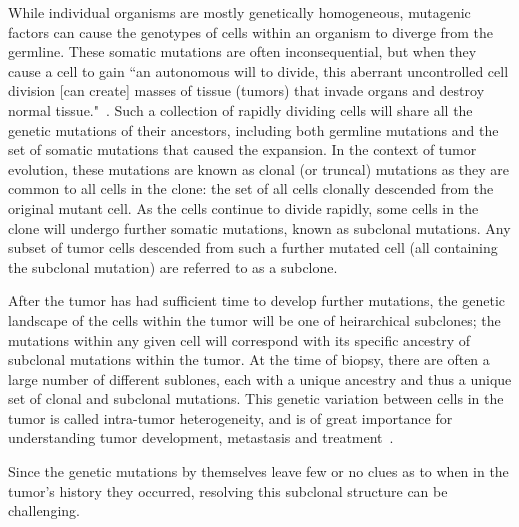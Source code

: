 \documentclass[../../main.tex]{subfiles}
\begin{document}
While individual organisms are mostly genetically homogeneous, mutagenic factors can cause the genotypes of cells within an organism to diverge from the germline.
These somatic mutations are often inconsequential, but when they cause a cell to gain ``an autonomous will to divide, this aberrant uncontrolled cell division [can create] masses of tissue (tumors) that invade organs and destroy normal tissue."~\cite{EmperorMaladies}. 
Such a collection of rapidly dividing cells will share all the genetic mutations of their ancestors, including both germline mutations and the set of somatic mutations that caused the expansion.
In the context of tumor evolution, these mutations are known as clonal (or truncal) mutations as they are common to all cells in the clone: the set of all cells clonally descended from the original mutant cell.
As the cells continue to divide rapidly, some cells in the clone will undergo further somatic mutations, known as subclonal mutations.
Any subset of tumor cells descended from such a further mutated cell (all containing the subclonal mutation) are referred to as a subclone.

After the tumor has had sufficient time to develop further mutations, the genetic landscape of the cells within the tumor will be one of heirarchical subclones; the mutations within any given cell will correspond with its specific ancestry of subclonal mutations within the tumor.
At the time of biopsy, there are often a large number of different sublones, each with a unique ancestry and thus a unique set of clonal and subclonal mutations.
This genetic variation between cells in the tumor is called intra-tumor heterogeneity, and is of great importance for understanding tumor development, metastasis and treatment~\cite{metastatic}.

Since the genetic mutations by themselves leave few or no clues as to when in the tumor's history they occurred, resolving this subclonal structure can be challenging.

\end{document}
